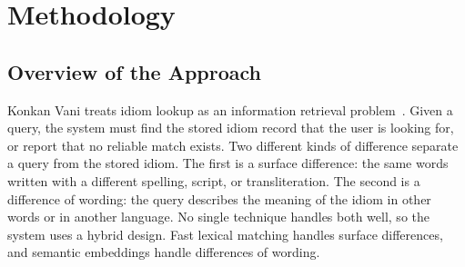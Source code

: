 \documentclass[12pt,a4paper]{article}
\let\oldsection\section
\renewcommand{\section}{\clearpage\oldsection}
\begin{document}
\section{Methodology}

\subsection{Overview of the Approach}
Konkan Vani treats idiom lookup as an information retrieval problem~\cite{manning}. Given a query, the system must find the stored idiom record that the user is looking for, or report that no reliable match exists. Two different kinds of difference separate a query from the stored idiom. The first is a surface difference: the same words written with a different spelling, script, or transliteration. The second is a difference of wording: the query describes the meaning of the idiom in other words or in another language. No single technique handles both well, so the system uses a hybrid design. Fast lexical matching handles surface differences, and semantic embeddings handle differences of wording.
\end{document}
